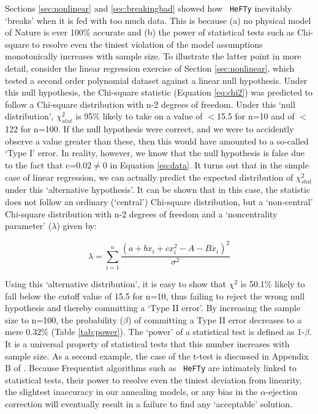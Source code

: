 \documentclass{article}
\begin{document}
Sections \ref{sec:nonlinear} and \ref{sec:breakingbad} showed how {\tt
  HeFTy} inevitably `breaks' when it is fed with too much data.  This
is because (a) no physical model of Nature is ever 100\% accurate and
(b) the power of statistical tests such as Chi-square to resolve even
the tiniest violation of the model assumptions monotonically increases
with sample size. To illustrate the latter point in more detail,
consider the linear regression exercise of Section
\ref{sec:nonlinear}, which tested a second order polynomial dataset
against a linear null hypothesis. Under this null hypothesis, the
Chi-square statistic (Equation \ref{eq:chi2}) was predicted to follow
a Chi-square distribution with n-2 degrees of freedom. Under this
`null distribution', $\chi_{stat}^2$ is 95\% likely to take on a value
of $<$15.5 for n=10 and of $<$ 122 for n=100. If the null hypothesis
were correct, and we were to accidently observe a value greater than
these, then this would have amounted to a so-called `Type I' error. In
reality, however, we know that the null hypothesis is false due to the
fact that c=0.02$\neq$0 in Equation \ref{eq:data}.  It turns out that
in the simple case of linear regression, we can actually predict the
expected distribution of $\chi_{stat}^2$ under this `alternative
hypothesis'. It can be shown that in this case, the statistic does not
follow an ordinary (`central') Chi-square distribution, but a
`non-central' Chi-square distribution \cite{cohen1977} with n-2
degrees of freedom and a `noncentrality parameter' ($\lambda$) given
by:

\begin{equation}
\lambda = \sum_{i=1}^{n} \frac{(a+bx_i+cx_i^2-A-Bx_i)^2}{\sigma^2}
\label{eq:lambda}
\end{equation}

Using this `alternative distribution', it is easy to show that
$\chi^2$ is 50.1\% likely to fall below the cutoff value of 15.5 for
n=10, thus failing to reject the wrong null hypothesis and thereby
committing a `Type II error'. By increasing the sample size to n=100,
the probability ($\beta$) of committing a Type II error decreases to a
mere 0.32\% (Table \ref{tab:power}). The `power' of a statistical test
is defined as 1-$\beta$. It is a universal property of statistical
tests that this number increases with sample size.  As a second
example, the case of the t-test is discussed in Appendix B of
\cite{vermeesch2013}.  Because Frequentist algorithms such as {\tt
  HeFTy} are intimately linked to statistical tests, their power to
resolve even the tiniest deviation from linearity, the slightest
inaccuracy in our annealing models, or any bias in the
$\alpha$-ejection correction will eventually result in a failure to
find any `acceptable' solution.
\end{document}
